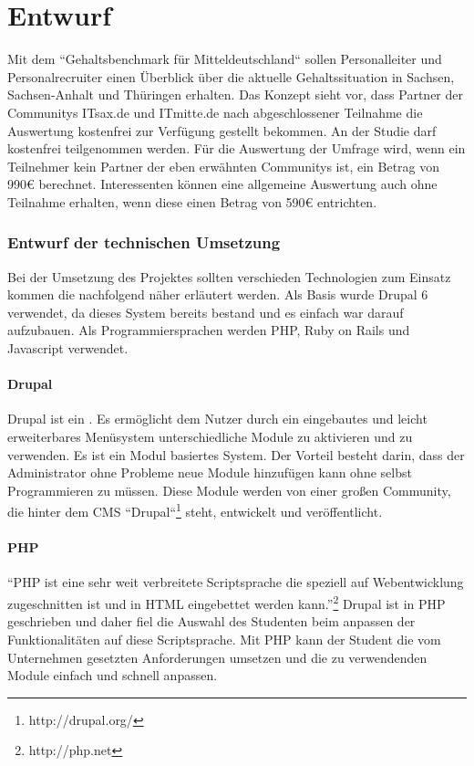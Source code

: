 \part{Entwurf}
Mit dem ``Gehaltsbenchmark für Mitteldeutschland`` sollen Personalleiter und Personalrecruiter einen Überblick über die aktuelle Gehaltssituation in Sachsen, Sachsen-Anhalt und Thüringen erhalten. 
Das Konzept sieht vor, dass Partner der Communitys ITsax.de und ITmitte.de nach abgeschlossener Teilnahme die Auswertung kostenfrei zur Verfügung gestellt bekommen. An der Studie darf kostenfrei teilgenommen werden. Für die Auswertung der Umfrage wird, wenn ein Teilnehmer kein Partner der eben erwähnten Communitys ist, ein Betrag von 990€ berechnet. 
Interessenten können eine allgemeine Auswertung auch ohne Teilnahme erhalten, wenn diese einen Betrag von 590€ entrichten.
\section{Entwurf der technischen Umsetzung}
Bei der Umsetzung des Projektes sollten verschieden Technologien zum Einsatz kommen die nachfolgend näher erläutert werden. Als Basis wurde Drupal 6 verwendet, da dieses System bereits bestand und es einfach war darauf aufzubauen.
Als Programmiersprachen werden PHP, Ruby on Rails und Javascript verwendet. 
\subsection{Drupal}
Drupal ist ein . Es ermöglicht dem Nutzer durch ein eingebautes und leicht erweiterbares Menüsystem unterschiedliche Module zu aktivieren und zu verwenden. 
Es ist ein Modul basiertes System. Der Vorteil besteht darin, dass der Administrator ohne Probleme neue Module hinzufügen kann ohne selbst Programmieren zu müssen. 
Diese Module werden von einer großen Community, die hinter dem CMS ``Drupal``\footnote{http://drupal.org/} steht, entwickelt und veröffentlicht.
\subsection{PHP}
``PHP ist eine sehr weit verbreitete Scriptsprache die speziell auf Webentwicklung zugeschnitten ist und in HTML eingebettet werden kann.''\footnote{http://php.net}
Drupal ist in PHP geschrieben und daher fiel die Auswahl des Studenten beim anpassen der Funktionalitäten auf diese Scriptsprache. Mit PHP kann der Student die vom Unternehmen gesetzten Anforderungen umsetzen und die zu verwendenden Module einfach und schnell anpassen.
